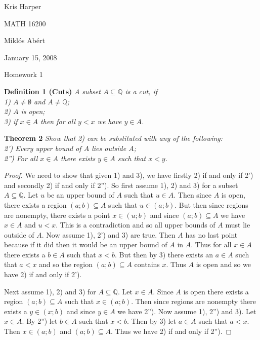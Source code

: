 \documentclass{article}
\begin{document}
\begin{flushright}
Kris Harper

MATH 16200

Mikl\'{o}s Ab\'{e}rt

January 15, 2008
\end{flushright}

\begin{center}
Homework 1
\end{center}

\begin{flushleft}

\textbf{Definition 1 (Cuts)}
\textsl{A subset $A \subseteq \mathbb{Q}$ is a cut, if\\
1) $A \neq \emptyset$ and $A \neq \mathbb{Q}$;\\
2) $A$ is open;\\
3) if $x \in A$ then for all $y<x$ we have $y \in A$.}
\newline

\textbf{Theorem 2}
\textsl{Show that 2) can be substituted with any of the following:\\
2') Every upper bound of $A$ lies outside $A$;\\
2'') For all $x \in A$ there exists $y \in A$ such that $x < y$.}
\begin{proof}
We need to show that given 1) and 3), we have firstly 2) if and only if 2') and secondly 2) if and only if 2''). So first assume 1), 2) and 3) for a subset $A \subseteq \mathbb{Q}$. Let $u$ be an upper bound of $A$ such that $u \in A$. Then since $A$ is open, there exists a region $(a;b) \subseteq A$ such that $u \in (a;b)$. But then since regions are nonempty, there exists a point $x \in (u;b)$ and since $(a;b) \subseteq A$ we have $x \in A$ and $u<x$. This is a contradiction and so all upper bounds of $A$ must lie outside of $A$. Now assume 1), 2') and 3) are true. Then $A$ has no last point because if it did then it would be an upper bound of $A$ in $A$. Thus for all $x \in A$ there exists a $b \in A$ such that $x<b$. But then by 3) there exists an $a \in A$ such that $a<x$ and so the region $(a;b) \subseteq A$ contains $x$. Thus $A$ is open and so we have 2) if and only if 2').\newline

Next assume 1), 2) and 3) for $A \subseteq \mathbb{Q}$. Let $x \in A$. Since $A$ is open there exists a region $(a;b) \subseteq A$ such that $x \in (a;b)$. Then since regions are nonempty there exists a $y \in (x;b)$ and since $y \in A$ we have 2''). Now assume 1), 2'') and 3). Let $x \in A$. By 2'') let $b \in A$ such that $x<b$. Then by 3) let $a \in A$ such that $a<x$. Then $x \in (a;b)$ and $(a;b) \subseteq A$. Thus we have 2) if and only if 2'').
\end{proof}


\end{flushleft}
\end{document}
